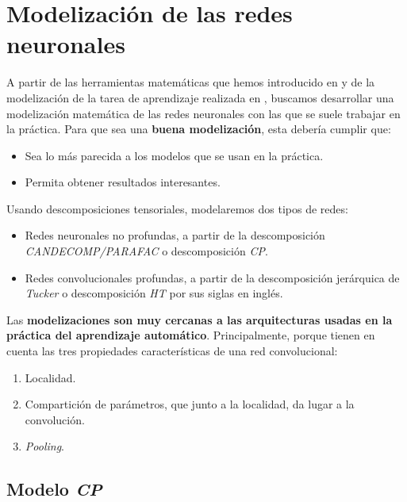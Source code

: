 \chapter{Modelización de las redes neuronales} \label{ch:modelizacion}

A partir de las herramientas matemáticas que hemos introducido en  y de la modelización de la tarea de aprendizaje realizada en , buscamos desarrollar una modelización matemática de las redes neuronales con las que se suele trabajar en la práctica. Para que sea una \textbf{buena modelización}, esta debería cumplir que:

\begin{itemize}
	\item Sea lo más parecida a los modelos que se usan en la práctica.
	\item Permita obtener resultados interesantes.
\end{itemize}

Usando descomposiciones tensoriales, modelaremos dos tipos de redes:

\begin{itemize}
	\item Redes neuronales no profundas, a partir de la descomposición \textit{CANDECOMP/PARAFAC} o descomposición \textit{CP}.
	\item Redes convolucionales profundas, a partir de la descomposición jerárquica de \textit{Tucker} o descomposición \textit{HT} por sus siglas en inglés.
\end{itemize}

Las \textbf{modelizaciones son muy cercanas a las arquitecturas usadas en la práctica del aprendizaje automático}. Principalmente, porque tienen en cuenta las tres propiedades características de una red convolucional:

\begin{enumerate}
	\item Localidad.
	\item Compartición de parámetros, que junto a la localidad, da lugar a la convolución.
	\item \textit{Pooling}.
\end{enumerate}

\section{Modelo \textit{CP}}

